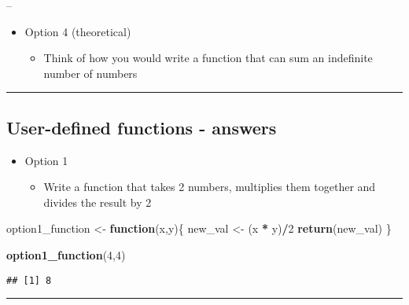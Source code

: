 \documentclass[]{article}
\newenvironment{Shaded}{\begin{snugshade}}{\end{snugshade}}
\newcommand{\ControlFlowTok}[1]{\textcolor[rgb]{0.13,0.29,0.53}{\textbf{#1}}}
\newcommand{\DecValTok}[1]{\textcolor[rgb]{0.00,0.00,0.81}{#1}}
\newcommand{\KeywordTok}[1]{\textcolor[rgb]{0.13,0.29,0.53}{\textbf{#1}}}
\newcommand{\NormalTok}[1]{#1}
\newcommand{\OperatorTok}[1]{\textcolor[rgb]{0.81,0.36,0.00}{\textbf{#1}}}
\newcommand{\StringTok}[1]{\textcolor[rgb]{0.31,0.60,0.02}{#1}}
\providecommand{\tightlist}{%
  \setlength{\itemsep}{0pt}\setlength{\parskip}{0pt}}
\begin{document}
--

\begin{itemize}
\tightlist
\item
  Option 4 (theoretical)

  \begin{itemize}
  \tightlist
  \item
    Think of how you would write a function that can sum an indefinite
    number of numbers
  \end{itemize}
\end{itemize}

\begin{center}\rule{0.5\linewidth}{\linethickness}\end{center}

\hypertarget{user-defined-functions---answers}{%
\subsection{User-defined functions -
answers}\label{user-defined-functions---answers}}

\begin{itemize}
\tightlist
\item
  Option 1

  \begin{itemize}
  \tightlist
  \item
    Write a function that takes 2 numbers, multiplies them together and
    divides the result by 2
  \end{itemize}
\end{itemize}

\begin{Shaded}
\begin{Highlighting}[]
\NormalTok{option1_function <-}\StringTok{ }\ControlFlowTok{function}\NormalTok{(x,y)\{}
\NormalTok{  new_val <-}\StringTok{ }\NormalTok{(x }\OperatorTok{*}\StringTok{ }\NormalTok{y)}\OperatorTok{/}\DecValTok{2}
  \KeywordTok{return}\NormalTok{(new_val)}
\NormalTok{\}}

\KeywordTok{option1_function}\NormalTok{(}\DecValTok{4}\NormalTok{,}\DecValTok{4}\NormalTok{)}
\end{Highlighting}
\end{Shaded}

\begin{verbatim}
## [1] 8
\end{verbatim}

\begin{center}\rule{0.5\linewidth}{\linethickness}\end{center}
\end{document}
